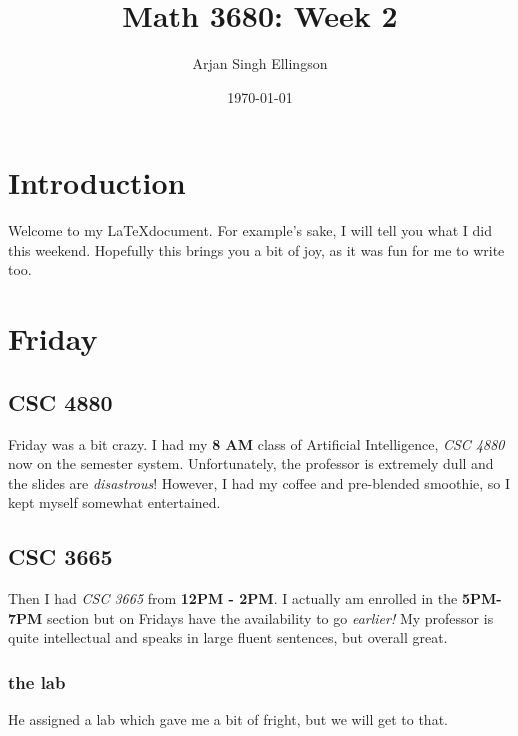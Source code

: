 \documentclass[12pt]{article} %
\title{Math 3680: Week 2}
\author{Arjan Singh Ellingson}
\date{\today}
\begin{document}
\maketitle 

\tableofcontents

\section{Introduction}
Welcome to my \LaTeX document. For example's sake, I will tell you what I did this weekend. Hopefully this brings you a bit of joy, as it was fun for me to write too.

\section{Friday}

\subsection{CSC 4880}
Friday was a bit crazy. I had my \textbf{8 AM} class of Artificial Intelligence, \textit{CSC 4880} now on the semester system. Unfortunately, the professor is extremely dull and the slides are \emph{disastrous}! However, I had my coffee and pre-blended smoothie, so I kept myself somewhat entertained.

\subsection{CSC 3665}
Then I had \textit{CSC 3665} from \textbf{12PM - 2PM}. I actually am enrolled in the \textbf{5PM-7PM} section but on Fridays have the availability to go \emph{earlier!} My professor is quite intellectual and speaks in large fluent sentences, but overall great. 
\subsubsection{the lab}
He assigned a lab which gave me a bit of fright, but we will get to that.
\end{document}

